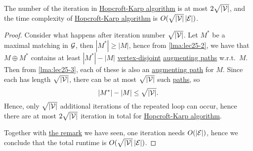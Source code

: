 \begin{theorem}
	The number of the iteration in \hyperref[algo:Hopcroft-Karp-algorithm]{Hopcroft-Karp algorithm} is at most \(2\sqrt{\left\vert \mathcal{\MakeUppercase{v}}  \right\vert } \), and the time complexity of \hyperref[algo:Hopcroft-Karp-algorithm]{Hopcroft-Karp algorithm} is \(O(\sqrt{\left\vert \mathcal{\MakeUppercase{v}}  \right\vert } \left\vert \mathcal{\MakeUppercase{e}}  \right\vert )\).
\end{theorem}
\begin{proof}
	Consider what happens after iteration number \(\sqrt{\left\vert \mathcal{\MakeUppercase{v}}  \right\vert } \). Let \(M^{\ast} \) be a maximal matching in \(\mathcal{\MakeUppercase{g}} \), then \(\left\vert M^{\ast}  \right\vert \geq \left\vert M \right\vert \), hence from \autoref{lma:lec25-2}, we have that \(M\oplus M^{\ast} \) contains at least \(\left\vert M^{\ast}  \right\vert - \left\vert M \right\vert \) \hyperref[def:vertex-independent]{vertex-disjoint} \hyperref[def:augmenting-path]{augmenting paths} w.r.t.\ \(M\). Then from \autoref{lma:lec25-3}, each of these is also an \hyperref[def:augmenting-path]{augmenting path} for \(M\). Since each has length \(\sqrt{\left\vert \mathcal{\MakeUppercase{v}}  \right\vert } \), there can be at most \(\sqrt{\left\vert \mathcal{\MakeUppercase{v}}  \right\vert } \) such \hyperref[def:path]{paths}, so
	\[
		\left\vert M^{\ast}  \right\vert - \left\vert M \right\vert \leq \sqrt{\left\vert \mathcal{\MakeUppercase{v}}  \right\vert } .
	\]
	Hence, only \(\sqrt{\left\vert \mathcal{\MakeUppercase{v}}  \right\vert } \) additional iterations of the repeated loop can occur, hence there are at most \(2 \sqrt{ \left\vert \mathcal{\MakeUppercase{v}}  \right\vert } \) iteration in total for \hyperref[algo:Hopcroft-Karp-algorithm]{Hopcroft-Karp algorithm}.

	Together with \hyperref[rmk:lec25-1]{the remark} we have seen, one iteration needs \(O(\left\vert \mathcal{\MakeUppercase{E}}  \right\vert )\), hence we conclude that the total runtime is \(O(\sqrt{\left\vert \mathcal{\MakeUppercase{v}}  \right\vert } \left\vert \mathcal{\MakeUppercase{e}}  \right\vert )\).
\end{proof}


